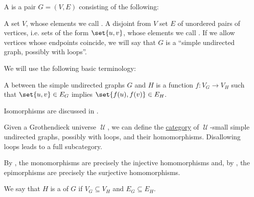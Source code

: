 \begin{definition}\label{def:undirected_graph}
  A  is a pair \( G = (V, E) \) consisting of the following:
  \begin{thmenum}[series=def:undirected_graph]
     A set \( V \), whose elements we call .
     A disjoint from \( V \) set \( E \) of unordered pairs of  vertices, i.e. sets of the form \( \set{ u, v } \), whose elements we call . If we allow vertices whose endpoints coincide, we will say that \( G \) is a \enquote{simple undirected graph, possibly with loops}.
  \end{thmenum}

  We will use the following basic terminology:
  \begin{thmenum}[resume=def:undirected_graph]
     A  between the simple undirected graphs \( G \) and \( H \) is a function \( f: V_G \to V_H \) such that \( \set{ u, v } \in E_G \) implies \( \set{ f(u), f(v) } \in E_H \).

    Isomorphisms are discussed in .

     Given a Grothendieck universe \( \mscrU \), we can define the \hyperref[def:category]{category} of \( \mscrU \)-small simple undirected graphs, possibly with loops, and their homomorphisms. Disallowing loops leads to a full subcategory.

    By , the monomorphisms are precisely the injective homomorphisms and, by , the epimorphisms are precisely the surjective homomorphisms.

     We say that \( H \) is a  of \( G \) if \( V_G \subseteq V_H \) and \( E_G \subseteq E_H \).
  \end{thmenum}
\end{definition}
